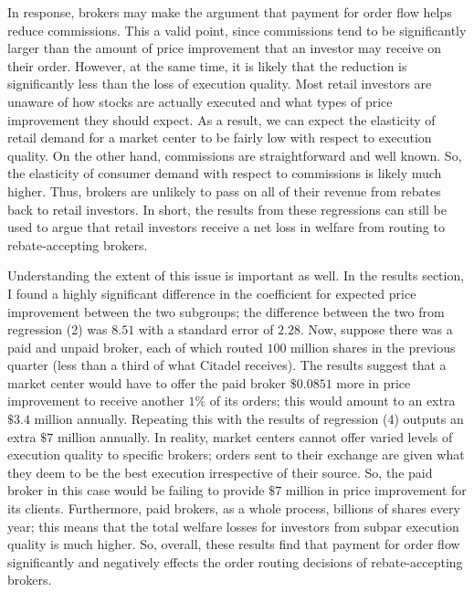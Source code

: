 \documentclass[12pt,a4paper]{article}
\begin{document}
	In response, brokers may make the argument that payment for order flow helps reduce commissions. This a valid point, since commissions tend to be significantly larger than the amount of price improvement that an investor may receive on their order. However, at the same time, it is likely that the reduction is significantly less than the loss of execution quality. Most retail investors are unaware of how stocks are actually executed and what types of price improvement they should expect. As a result, we can expect the elasticity of retail demand for a market center to be fairly low with respect to execution quality. On the other hand, commissions are straightforward and well known. So, the elasticity of consumer demand with respect to commissions is likely much higher. Thus, brokers are unlikely to pass on all of their revenue from rebates back to retail investors. In short, the results from these regressions can still be used to argue that retail investors receive a net loss in welfare from routing to rebate-accepting brokers. 
	
	Understanding the extent of this issue is important as well. In the results section, I found a highly significant difference in the coefficient for expected price improvement between the two subgroups; the difference between the two from regression (2) was $8.51$ with a standard error of $2.28$. Now, suppose there was a paid and unpaid broker, each of which routed $100$ million shares in the previous quarter (less than a third of what Citadel receives). The results suggest that a market center would have to offer the paid broker $\$0.0851$ more in price improvement to receive another $1\%$ of its orders; this would amount to an extra $\$3.4$ million annually. Repeating this with the results of regression (4) outputs an extra $\$7$ million annually. In reality, market centers cannot offer varied levels of execution quality to specific brokers; orders sent to their exchange are given what they deem to be the best execution irrespective of their source. So, the paid broker in this case would be failing to provide $\$7$ million in price improvement for its clients. Furthermore, paid brokers, as a whole process, billions of shares every year; this means that the total welfare losses for investors from subpar execution quality is much higher. So, overall, these results find that payment for order flow significantly and negatively effects the order routing decisions of rebate-accepting brokers. 
	

	
\pagebreak
\end{document}
